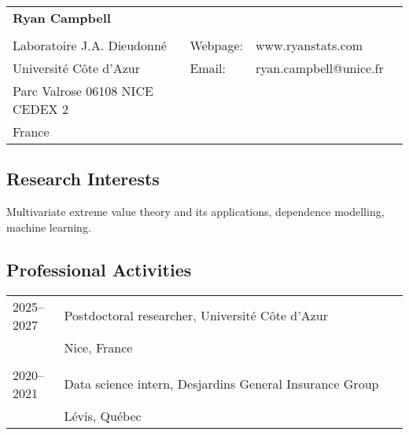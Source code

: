 \documentclass[11pt,]{scrartcl}
\begin{document}
\thispagestyle{firstpage}

\begin{table}[h]
{\def\arraystretch{1.1}\tabcolsep=0pt
\begin{tabular}{p{0.55\linewidth}p{0.05\linewidth}p{0.40\linewidth}}

  \multirow{1}{*}{\LARGE \textbf{Ryan Campbell}} &  &  \\
  
  & & \\
  
   Laboratoire J.A. Dieudonn\'{e} & \multicolumn{1}{l}{Webpage:\;\;} & \multicolumn{1}{l}{www.ryanstats.com} \\
  
  Universit\'{e} C\^{o}te d'Azur & \multicolumn{1}{l}{Email:\;\;} &\multicolumn{1}{l}{ryan.campbell@unice.fr} \\
  
   Parc Valrose 06108 NICE CEDEX 2 & & \\ %
  
  France &  &  \\

\end{tabular}%
}
\end{table}

\subsection{Research Interests}\label{interests}
{Multivariate extreme value theory and its applications, dependence modelling, machine learning.}

\subsection{Professional Activities}\label{professional-activities}
\begin{table}[h]
{\def\arraystretch{1.1}\tabcolsep=0pt
\begin{tabular}{p{0.13\linewidth}p{0.87\linewidth}}

  {2025--2027} & Postdoctoral researcher, Universit\'{e} C\^{o}te d'Azur\\
  & Nice, France \\ \\
  {2020--2021} & Data science intern, Desjardins General Insurance Group\\
  &  L\'{e}vis, Qu\'{e}bec
\end{tabular}%
}
\end{table}
\end{document}
